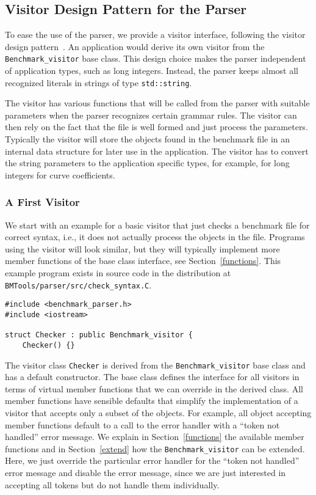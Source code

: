 \subsection{Visitor Design Pattern for the Parser}
\label{visitor}

To ease the use of the parser, we provide a visitor interface,
following the visitor design pattern~\cite{cgal:ghjv-dpero-95}.  An
application would derive its own visitor from the
\texttt{Benchmark\_visitor} base class. This design choice makes the
parser independent of application types, such as long integers.
Instead, the parser keeps almost all recognized literals in strings of
type \texttt{std::string}.

The visitor has various functions that will be called from the parser
with suitable parameters when the parser recognizes certain grammar
rules. The visitor can then rely on the fact that the file is well
formed and just process the parameters. Typically the visitor will
store the objects found in the benchmark file in an internal data
structure for later use in the application. The visitor has to convert
the string parameters to the application specific types, for example,
for long integers for curve coefficients. 

\subsubsection{A First Visitor}
\label{checker}

We start with an example for a basic visitor that just checks a
benchmark file for correct syntax, i.e., it does not actually process
the objects in the file. Programs using the visitor will look similar,
but they will typically implement more member functions of the base
class interface, see Section~\ref{functions}. This example program
exists in source code in the distribution at
\verb|BMTools/parser/src/check_syntax.C|. 

\begin{verbatim}
#include <benchmark_parser.h>
#include <iostream>

struct Checker : public Benchmark_visitor {
    Checker() {}
\end{verbatim}

\noindent
The visitor class \texttt{Checker} is derived from the
\texttt{Benchmark\_visitor} base class and has a default constructor.
The base class defines the interface for all visitors in terms of
virtual member functions that we can override in the derived class.
All member functions have sensible defaults that simplify the
implementation of a visitor that accepts only a subset of the objects.
For example, all object accepting member functions default to a call
to the error handler with a ``token not handled'' error message. We
explain in Section~\ref{functions} the available member functions and
in Section~\ref{extend} how the \texttt{Benchmark\_visitor} can be
extended. Here, we just override the particular error handler for 
the ``token not handled'' error message and disable the error message,
since we are just interested in accepting all tokens but do not handle
them individually.

